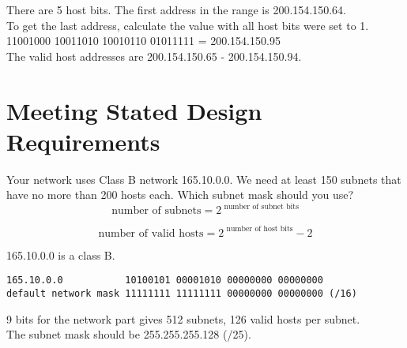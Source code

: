 \documentclass{article}
\begin{document}
There are 5 host bits. The first address in the range is 200.154.150.64.\\

To get the last address, calculate the value with all host bits were set to 1.\\

11001000 10011010 10010110 01011111 = 200.154.150.95\\

The valid host addresses are 200.154.150.65 - 200.154.150.94.

\section{Meeting Stated Design Requirements}

Your network uses Class B network 165.10.0.0. We need at least 150 subnets
that have no more than 200 hosts each. Which subnet mask should you use?\\

\begin{equation}
\mbox{number of subnets} = 2 ^{\mbox{ number of subnet bits}}
\end{equation}

\begin{equation}
\mbox{number of valid hosts} = 2 ^{\mbox{ number of host bits}} - 2
\end{equation}

165.10.0.0 is a class B.

\begin{verbatim}
165.10.0.0           10100101 00001010 00000000 00000000
default network mask 11111111 11111111 00000000 00000000 (/16)
\end{verbatim}

9 bits for the network part gives 512 subnets, 126 valid hosts per subnet.\\

The subnet mask should be 255.255.255.128 (/25).
\end{document}

